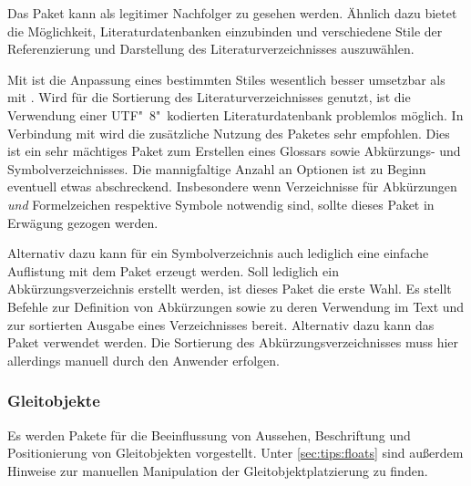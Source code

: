 \begin{DeclarePackages}[Verzeichnisse|?]
  Das Paket kann als legitimer Nachfolger zu  gesehen werden. 
  Ähnlich dazu bietet  die Möglichkeit, Literaturdatenbanken 
  einzubinden und verschiedene Stile der Referenzierung und Darstellung des 
  Literaturverzeichnisses auszuwählen. 
  
  Mit  ist die Anpassung eines bestimmten Stiles wesentlich 
  besser umsetzbar als mit . Wird  für die 
  Sortierung des Literaturverzeichnisses genutzt, ist die Verwendung einer 
  UTF"~8"~kodierten Literaturdatenbank problemlos möglich. In Verbindung mit 
   wird die zusätzliche Nutzung des Paketes 
   sehr empfohlen.
  Dies ist ein sehr mächtiges Paket zum Erstellen eines Glossars sowie 
  Abkürzungs- und Symbolverzeichnisses. Die mannigfaltige Anzahl an Optionen 
  ist zu Beginn eventuell etwas abschreckend. Insbesondere wenn Verzeichnisse 
  für Abkürzungen \emph{und} Formelzeichen respektive Symbole notwendig sind, 
  sollte dieses Paket in Erwägung gezogen werden.
  
  Alternativ dazu kann für ein Symbolverzeichnis auch lediglich eine einfache 
  Auflistung mit dem Paket  erzeugt werden.
  Soll lediglich ein Abkürzungsverzeichnis erstellt werden, ist dieses Paket 
  die erste Wahl. Es stellt Befehle zur Definition von Abkürzungen sowie zu 
  deren Verwendung im Text und zur sortierten Ausgabe eines Verzeichnisses 
  bereit. Alternativ dazu kann das Paket  verwendet werden. 
  Die Sortierung des Abkürzungsverzeichnisses muss hier allerdings manuell 
  durch den Anwender erfolgen.
\end{DeclarePackages}



\subsubsection{%
  Gleitobjekte%
}

Es werden Pakete für die Beeinflussung von Aussehen, Beschriftung und 
Positionierung von Gleitobjekten vorgestellt. Unter \autoref{sec:tips:floats} 
sind außerdem Hinweise zur manuellen Manipulation der Gleitobjektplatzierung zu 
finden.

